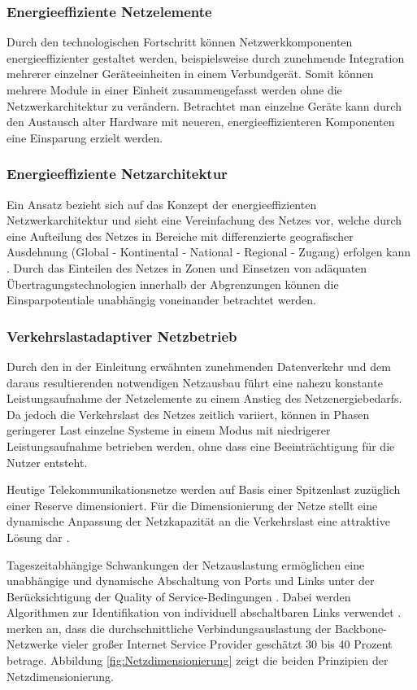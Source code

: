 \subsubsection{Energieeffiziente Netzelemente}
Durch den technologischen Fortschritt können Netzwerkkomponenten energieeffizienter gestaltet werden, beispielsweise durch zunehmende Integration mehrerer einzelner Geräte\-einheiten in einem Verbundgerät. Somit können mehrere Module in einer Einheit zusammengefasst werden ohne die Netzwerkarchitektur zu verändern. Betrachtet man einzelne Geräte kann durch den Austausch alter Hardware mit neueren, energieeffizienteren Komponenten eine Einsparung erzielt werden. 

\subsubsection{Energieeffiziente Netzarchitektur}
Ein Ansatz bezieht sich auf das Konzept der energieeffizienten Netzwerkarchitektur und sieht eine Vereinfachung des Netzes vor, welche durch eine  Aufteilung des Netzes in Bereiche mit differenzierte geografischer Ausdehnung (Global - Kontinental - National - Regional - Zugang) erfolgen kann \cite{aleksic2014}. Durch das Einteilen des Netzes in Zonen und Einsetzen von adäquaten Übertragungs\-technologien innerhalb der Abgrenzungen können die Einsparpotentiale unabhängig voneinander betrachtet werden.

\subsubsection{Verkehrslastadaptiver Netzbetrieb}
Durch den in der Einleitung erwähnten zunehmenden Datenverkehr und dem daraus resultierenden notwendigen Netzausbau führt eine nahezu konstante Leistungsaufnahme der Netzelemente zu einem Anstieg des Netzenergiebedarfs. Da jedoch die Verkehrslast des Netzes zeitlich variiert, können in Phasen geringerer Last einzelne Systeme in einem Modus mit niedrigerer Leistungsaufnahme betrieben werden, ohne dass eine Beeinträchtigung für die Nutzer entsteht.

Heutige Telekommunikationsnetze werden auf Basis einer Spitzenlast zuzüglich einer Reserve dimensioniert. Für die Dimensionierung der Netze stellt eine dynamische Anpassung der Netzkapazität an die Verkehrslast eine attraktive Lösung dar \cite{lange}.

Tageszeitabhängige Schwankungen der Netzauslastung ermöglichen eine unabhängige und dynamische Abschaltung von Ports und Links unter der Be\-rück\-sich\-ti\-gung der Quality of Service-Bedingungen \cite{aleksic2013}. Dabei werden Algorithmen zur Identifikation von individuell abschaltbaren Links verwendet \cite{fassnacht}. \textcite[1]{fisher} merken an, dass die durchschnittliche Verbindungsauslastung der Backbone-Netzwerke vieler großer Internet Service Provider geschätzt 30 bis 40 Prozent betrage. Abbildung \ref{fig:Netzdimensionierung} zeigt die beiden Prinzipien der Netzdimensionierung.

